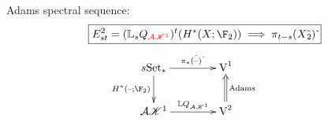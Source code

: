\documentclass{beamer}
\renewcommand{\calC}{\scrK}
\begin{document}
\begin{first section}
{Adams spectral sequence:
\[\boxed{E^2_{st}=(\mathbb{L}_sQ_{\color{red}\calA\calC^1})^t(H^*(X;\F_2))\implies \pi_{t-s}(X{_2\!\!\!\hat{\phantom{e}}})\,\check{ }}\] \pause 
\[\xymatrix@!0@R=7mm@C=23mm{
s\textup{Set}_*\ar[r]^-{\pi_*(\hat{\rule{0pt}{2mm}\DASH})\check{\phantom{i}}}
&
\textup{V}^1&
\\
\\
\ar[uu];[]_-{H^*(\DASH;\F_2)}
\calA\calC^1
\ar[r]^-{\mathbb{L}Q_{\calA\calC^1}}
&
\textup{V}^2
\ar@{=>}[uu]_-{\textup{Adams}}
}\]
}
%
%

\end{first section}
\end{document}

